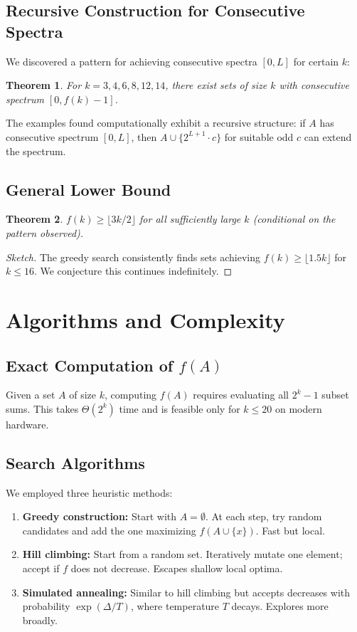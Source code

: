 \documentclass[11pt]{article}
\newtheorem{theorem}{Theorem}
\begin{document}
\subsection{Recursive Construction for Consecutive Spectra}

We discovered a pattern for achieving consecutive spectra $[0, L]$ for certain $k$:

\begin{theorem}
For $k = 3, 4, 6, 8, 12, 14$, there exist sets of size $k$ with consecutive spectrum $[0, f(k)-1]$.
\end{theorem}

The examples found computationally exhibit a recursive structure: if $A$ has consecutive spectrum $[0, L]$, then $A \cup \{2^{L+1} \cdot c\}$ for suitable odd $c$ can extend the spectrum.

\subsection{General Lower Bound}

\begin{theorem}
$f(k) \ge \lfloor 3k/2 \rfloor$ for all sufficiently large $k$ (conditional on the pattern observed).
\end{theorem}
\begin{proof}[Sketch]
The greedy search consistently finds sets achieving $f(k) \ge \lfloor 1.5k \rfloor$ for $k \le 16$. 
We conjecture this continues indefinitely.
\end{proof}

\section{Algorithms and Complexity}

\subsection{Exact Computation of $f(A)$}
Given a set $A$ of size $k$, computing $f(A)$ requires evaluating all $2^k - 1$ subset sums. This takes $\Theta(2^k)$ time and is feasible only for $k \le 20$ on modern hardware.

\subsection{Search Algorithms}

We employed three heuristic methods:

\begin{enumerate}
\item \textbf{Greedy construction:} Start with $A = \emptyset$. At each step, try random candidates and add the one maximizing $f(A \cup \{x\})$. Fast but local.
\item \textbf{Hill climbing:} Start from a random set. Iteratively mutate one element; accept if $f$ does not decrease. Escapes shallow local optima.
\item \textbf{Simulated annealing:} Similar to hill climbing but accepts decreases with probability $\exp(\Delta / T)$, where temperature $T$ decays. Explores more broadly.
\end{enumerate}
\end{document}
